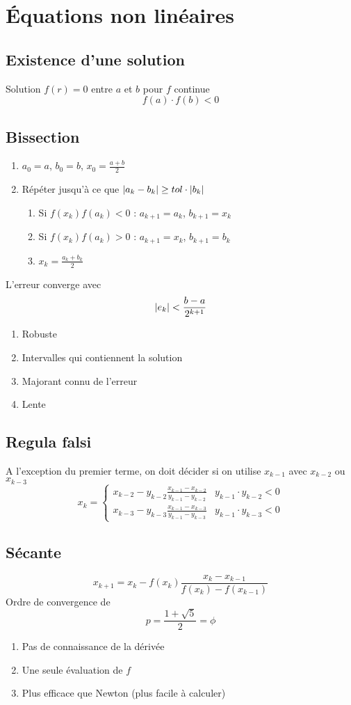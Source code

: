 \documentclass[resume]{subfiles}
\begin{document}
    \section{Équations non linéaires}
	\subsection{Existence d'une solution}
	Solution $f(r)=0$ entre $a$ et $b$ pour $f$ continue
	$$f(a)\cdot f(b)<0$$
	\subsection{Bissection}
	\begin{enumerate}
	\item $a_0=a$, $b_0=b$, $x_0=\frac{a+b}{2}$
	\item Répéter jusqu'à ce que $\abs{a_k-b_k}\geq tol\cdot \abs{b_k}$
	\begin{enumerate}
	\item Si $f(x_k)f(a_k)<0$ : $a_{k+1}=a_k$, $b_{k+1}=x_k$
	\item Si $f(x_k)f(a_k)>0$ : $a_{k+1}=x_k$, $b_{k+1}=b_k$
	\item $x_{k}=\frac{a_{k}+b_{k}}{2}$
	\end{enumerate}
	\end{enumerate}
	L'erreur converge avec
	$$\abs{e_k}<\frac{b-a}{2^{k+1}}$$
	\begin{enumerate}
	\item Robuste
	\item Intervalles qui contiennent la solution
	\item Majorant connu de l'erreur
	\item Lente
	\end{enumerate}
	\subsection{Regula falsi}
A l'exception du premier terme, on doit décider si on utilise $x_{k-1}$ avec $x_{k-2}$ ou $x_{k-3}$
$$\boxed{x_{k}=\begin{cases}
x_{k-2}-y_{k-2}\frac{x_{k-1}-x_{k-2}}{y_{k-1}-y_{k-2}} & y_{k-1}\cdot y_{k-2} < 0\\
x_{k-3}-y_{k-3}\frac{x_{k-1}-x_{k-3}}{y_{k-1}-y_{k-3}} & y_{k-1}\cdot y_{k-3} < 0
\end{cases}}$$
\subsection{Sécante}
$$\boxed{x_{k+1}=x_{k}-f(x_k)\frac{x_k-x_{k-1}}{f(x_k)-f(x_{k-1})}}$$
Ordre de convergence de
$$p=\frac{1+\sqrt{5}}{2}=\phi$$
\begin{enumerate}
\item Pas de connaissance de la dérivée
\item Une seule évaluation de $f$
\item Plus efficace que Newton (plus facile à calculer)
\end{enumerate}
\end{document}
